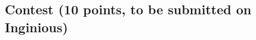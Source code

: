 \documentclass[11pt,a4paper]{report}
\begin{document}
\subsection{Contest (10 points, to be submitted on Inginious)}


    

\end{document}
